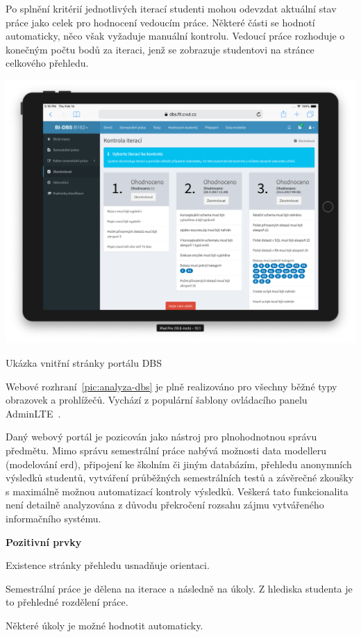 Po splnění kritérií jednotlivých iterací studenti mohou odevzdat aktuální stav práce jako celek pro hodnocení vedoucím práce. Některé části se hodnotí automaticky, něco však vyžaduje manuální kontrolu. Vedoucí práce rozhoduje o konečným počtu bodů za iteraci, jenž se zobrazuje studentovi na stránce celkového přehledu.

\begin{fig:illustration}
   \includegraphics[width=1\textwidth]{images/analyza-dbs.png}
   \caption{Ukázka vnitřní stránky portálu DBS}\label{pic:analyza-dbs}
\end{fig:illustration}


Webové rozhraní~\ref{pic:analyza-dbs} je plně realizováno pro všechny běžné typy obrazovek a prohlížečů. Vychází z populární šablony ovládacího panelu AdminLTE~\cite{adminLTE}.

Daný webový portál je pozicován jako nástroj pro plnohodnotnou správu předmětu. Mimo správu semestrální práce nabývá možnosti data modelleru (modelování \gls{erd}), připojení ke školním či jiným databázím, přehledu anonymních výsledků studentů, vytváření průběžných semestrálních testů a závěrečné zkoušky s maximálně možnou automatizací kontroly výsledků. Veškerá tato funkcionalita není detailně analyzována z důvodu překročení rozsahu zájmu vytvářeného informačního systému.

\textbf{Pozitivní prvky}
\begin{ul}
   \item Existence stránky přehledu usnadňuje orientaci.
   \item Semestrální práce je dělena na iterace a následně na úkoly. Z hlediska studenta je to přehledné rozdělení práce.
   \item Některé úkoly je možné hodnotit automaticky.
\end{ul}

